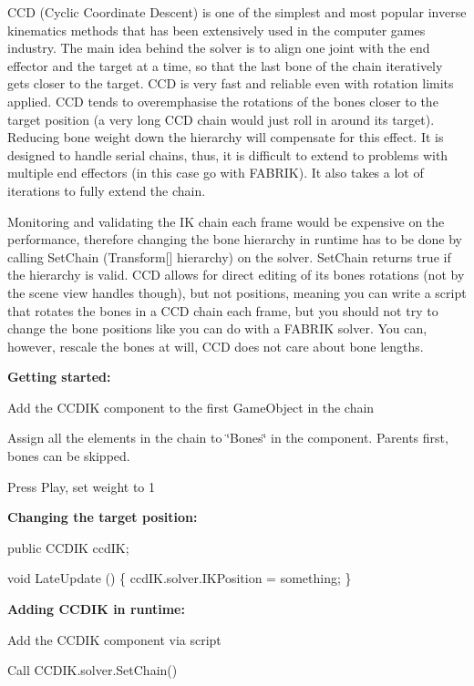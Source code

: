 C\+CD (Cyclic Coordinate Descent) is one of the simplest and most popular inverse kinematics methods that has been extensively used in the computer games industry. The main idea behind the solver is to align one joint with the end effector and the target at a time, so that the last bone of the chain iteratively gets closer to the target. C\+CD is very fast and reliable even with rotation limits applied. C\+CD tends to overemphasise the rotations of the bones closer to the target position (a very long C\+CD chain would just roll in around it\textquotesingle{}s target). Reducing bone weight down the hierarchy will compensate for this effect. It is designed to handle serial chains, thus, it is difficult to extend to problems with multiple end effectors (in this case go with F\+A\+B\+R\+IK). It also takes a lot of iterations to fully extend the chain.

Monitoring and validating the IK chain each frame would be expensive on the performance, therefore changing the bone hierarchy in runtime has to be done by calling Set\+Chain (Transform\mbox{[}\mbox{]} hierarchy) on the solver. Set\+Chain returns true if the hierarchy is valid. C\+CD allows for direct editing of it\textquotesingle{}s bones\textquotesingle{} rotations (not by the scene view handles though), but not positions, meaning you can write a script that rotates the bones in a C\+CD chain each frame, but you should not try to change the bone positions like you can do with a F\+A\+B\+R\+IK solver. You can, however, rescale the bones at will, C\+CD does not care about bone lengths.

{\bfseries Getting started\+:}
\begin{DoxyItemize}
\item Add the C\+C\+D\+IK component to the first Game\+Object in the chain
\item Assign all the elements in the chain to \char`\"{}\+Bones\char`\"{} in the component. Parents first, bones can be skipped.
\item Press Play, set weight to 1
\end{DoxyItemize}

{\bfseries Changing the target position\+:}


\begin{DoxyCode}
\textcolor{keyword}{public} CCDIK ccdIK;

\textcolor{keywordtype}{void} LateUpdate () \{
    ccdIK.solver.IKPosition = something;
\}
\end{DoxyCode}


{\bfseries Adding C\+C\+D\+IK in runtime\+:}
\begin{DoxyItemize}
\item Add the C\+C\+D\+IK component via script
\item Call C\+C\+D\+I\+K.\+solver.\+Set\+Chain()
\end{DoxyItemize}


